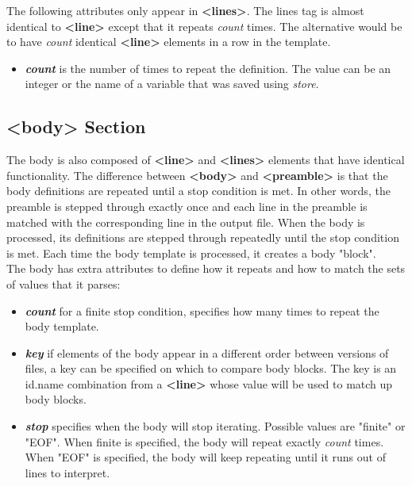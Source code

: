 \documentclass[paper=a4, fontsize=11pt]{scrartcl} %
\numberwithin{equation}{section} %
\numberwithin{figure}{section} %
\numberwithin{table}{section} %
\begin{document}
The following attributes only appear in \textbf{<lines>}. The lines tag is almost identical
to \textbf{<line>} except that it repeats \textit{count} times. The alternative would be to
have \textit{count} identical \textbf{<line>} elements in a row in the template.

\begin{itemize}
\item \textbf{\textit{count}} is the number of times to repeat the definition. The value can
be an integer or the name of a variable that was saved using \textit{store}.
\end{itemize}

\subsection{<body> Section}

The body is also composed of \textbf{<line>} and \textbf{<lines>} elements that have identical
functionality. The difference between \textbf{<body>} and \textbf{<preamble>} is that the body
definitions are repeated until a stop condition is met. In other words, the preamble is stepped
through exactly once and each line in the preamble is matched with the corresponding line in
the output file. When the body is processed, its definitions are stepped through repeatedly
until the stop condition is met. Each time the body template is processed, it creates a body
"block".\\

The body has extra attributes to define how it repeats and how to match the sets of values
that it parses:

\begin{itemize}
\item \textbf{\textit{count}} for a finite stop condition, specifies how many times to repeat
the body template.
\item \textbf{\textit{key}} if elements of the body appear in a different order between versions
of files, a key can be specified on which to compare body blocks. The key is an id.name combination
from a \textbf{<line>} whose value will be used to match up body blocks.
\item \textbf{\textit{stop}} specifies when the body will stop iterating. Possible values are
"finite" or "EOF". When finite is specified, the body will repeat exactly \textit{count} times.
When "EOF" is specified, the body will keep repeating until it runs out of lines to interpret.
\end{itemize}
\end{document}

